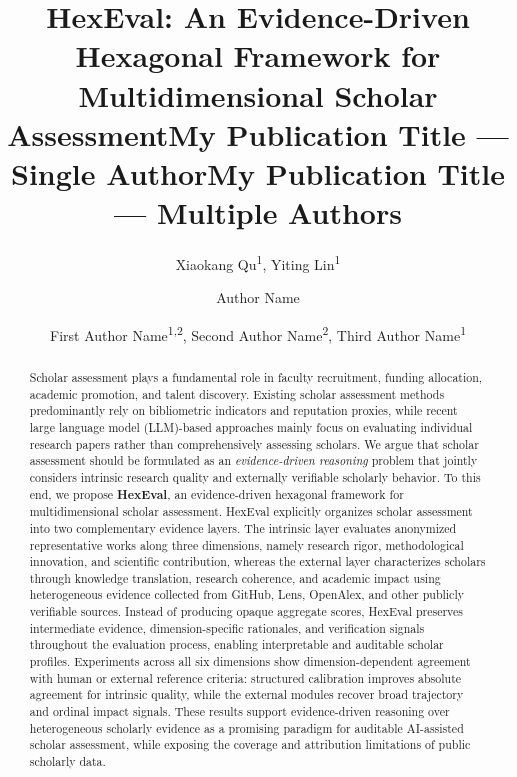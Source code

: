 \documentclass[letterpaper]{article} %
\title{HexEval: An Evidence-Driven Hexagonal Framework for Multidimensional Scholar Assessment}
\author{
    Xiaokang Qu\textsuperscript{\rm 1},
    Yiting Lin\textsuperscript{\rm 1}
}
\title{My Publication Title --- Single Author}
\author {
    Author Name
}
\title{My Publication Title --- Multiple Authors}
\author {
    First Author Name\textsuperscript{\rm 1,\rm 2}\equalcontrib,
    Second Author Name\textsuperscript{\rm 2}\equalcontrib,
    Third Author Name\textsuperscript{\rm 1}\corresponding
}
\begin{document}
\maketitle

\begin{abstract}

Scholar assessment plays a fundamental role in faculty recruitment, funding allocation, academic promotion, and talent discovery. Existing scholar assessment methods predominantly rely on bibliometric indicators and reputation proxies, while recent large language model (LLM)-based approaches mainly focus on evaluating individual research papers rather than comprehensively assessing scholars. We argue that scholar assessment should be formulated as an \emph{evidence-driven reasoning} problem that jointly considers intrinsic research quality and externally verifiable scholarly behavior. To this end, we propose \textbf{HexEval}, an evidence-driven hexagonal framework for multidimensional scholar assessment. HexEval explicitly organizes scholar assessment into two complementary evidence layers. The intrinsic layer evaluates anonymized representative works along three dimensions, namely research rigor, methodological innovation, and scientific contribution, whereas the external layer characterizes scholars through knowledge translation, research coherence, and academic impact using heterogeneous evidence collected from GitHub, Lens, OpenAlex, and other publicly verifiable sources. Instead of producing opaque aggregate scores, HexEval preserves intermediate evidence, dimension-specific rationales, and verification signals throughout the evaluation process, enabling interpretable and auditable scholar profiles. Experiments across all six dimensions show dimension-dependent agreement with human or external reference criteria: structured calibration improves absolute agreement for intrinsic quality, while the external modules recover broad trajectory and ordinal impact signals. These results support evidence-driven reasoning over heterogeneous scholarly evidence as a promising paradigm for auditable AI-assisted scholar assessment, while exposing the coverage and attribution limitations of public scholarly data.

\end{abstract}


\end{document}
